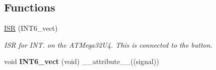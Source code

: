 \subsection*{Functions}
\begin{DoxyCompactItemize}
\item 
\hyperlink{group___engduino_button_ga28be307ba14efb36d0965f4be9c19b62}{I\+S\+R} (I\+N\+T6\+\_\+vect)
\begin{DoxyCompactList}\small\item\em I\+S\+R for I\+N\+T. on the A\+T\+Mega32\+U4. This is connected to the button. \end{DoxyCompactList}\item 
\hypertarget{group___engduino_button_ga6259e9cde08e3b67bf7cb921c4dd8458}{}void {\bfseries I\+N\+T6\+\_\+vect} (void) \+\_\+\+\_\+attribute\+\_\+\+\_\+((signal))\label{group___engduino_button_ga6259e9cde08e3b67bf7cb921c4dd8458}


\end{DoxyCompactItemize}
